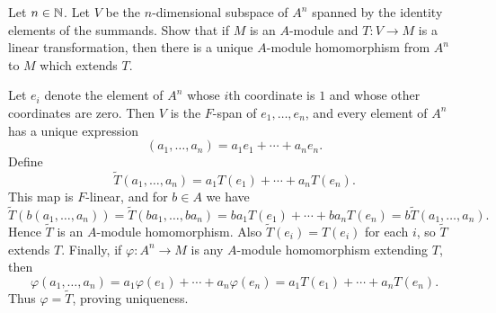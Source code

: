 \documentclass[../Odyssey_Project.tex]{subfiles}
\begin{document}
\begin{exercise}
\label{ex:13.1}
Let $n \in \mathbb{N}$. Let $V$ be the $n$-dimensional subspace of $A^n$ spanned by the identity elements of the summands. Show that if $M$ is an $A$-module and $T \colon V \to M$ is a linear transformation, then there is a unique $A$-module homomorphism from $A^n$ to $M$ which extends $T$.
\end{exercise}
\begin{solution}
    Let $e_i$ denote the element of $A^n$ whose $i$th coordinate is $1$ and whose other coordinates are zero. Then $V$ is the $F$-span of $e_1,\ldots,e_n$, and every element of $A^n$ has a unique expression
    \[
        (a_1,\ldots,a_n)=a_1e_1+\cdots+a_ne_n.
    \]
    Define
    \[
        \widetilde{T}(a_1,\ldots,a_n)=a_1T(e_1)+\cdots+a_nT(e_n).
    \]
    This map is $F$-linear, and for $b\in A$ we have
    \[
        \widetilde{T}(b(a_1,\ldots,a_n))
        =\widetilde{T}(ba_1,\ldots,ba_n)
        =ba_1T(e_1)+\cdots+ba_nT(e_n)
        =b\widetilde{T}(a_1,\ldots,a_n).
    \]
    Hence $\widetilde{T}$ is an $A$-module homomorphism. Also $\widetilde{T}(e_i)=T(e_i)$ for each $i$, so $\widetilde{T}$ extends $T$. Finally, if $\varphi \colon A^n\to M$ is any $A$-module homomorphism extending $T$, then
    \[
        \varphi(a_1,\ldots,a_n)
        =a_1\varphi(e_1)+\cdots+a_n\varphi(e_n)
        =a_1T(e_1)+\cdots+a_nT(e_n).
    \]
    Thus $\varphi=\widetilde{T}$, proving uniqueness.
\end{solution}
\end{document}
